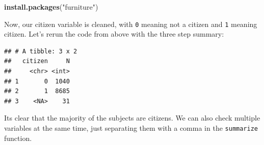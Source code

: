 \documentclass[]{tufte-book}
\newenvironment{Shaded}{}{}
\newcommand{\KeywordTok}[1]{\textcolor[rgb]{0.00,0.44,0.13}{\textbf{#1}}}
\newcommand{\DataTypeTok}[1]{\textcolor[rgb]{0.56,0.13,0.00}{#1}}
\newcommand{\DecValTok}[1]{\textcolor[rgb]{0.25,0.63,0.44}{#1}}
\newcommand{\StringTok}[1]{\textcolor[rgb]{0.25,0.44,0.63}{#1}}
\newcommand{\CommentTok}[1]{\textcolor[rgb]{0.38,0.63,0.69}{\textit{#1}}}
\newcommand{\OtherTok}[1]{\textcolor[rgb]{0.00,0.44,0.13}{#1}}
\newcommand{\OperatorTok}[1]{\textcolor[rgb]{0.40,0.40,0.40}{#1}}
\newcommand{\NormalTok}[1]{#1}
\theoremstyle{definition}
\theoremstyle{definition}
\theoremstyle{remark}
\begin{document}
\begin{Shaded}
\begin{Highlighting}[]
\KeywordTok{install.packages}\NormalTok{(}\StringTok{"furniture"}\NormalTok{)}
\end{Highlighting}
\end{Shaded}

\begin{Shaded}
\end{Shaded}

Now, our citizen variable is cleaned, with \texttt{0} meaning not a
citizen and \texttt{1} meaning citizen. Let's rerun the code from above
with the three step summary:

\begin{Shaded}
\end{Shaded}

\begin{verbatim}
## # A tibble: 3 x 2
##   citizen     N
##     <chr> <int>
## 1       0  1040
## 2       1  8685
## 3    <NA>    31
\end{verbatim}

Its clear that the majority of the subjects are citizens. We can also
check multiple variables at the same time, just separating them with a
comma in the \texttt{summarize} function.

\begin{Shaded}
\end{Shaded}
\end{document}
